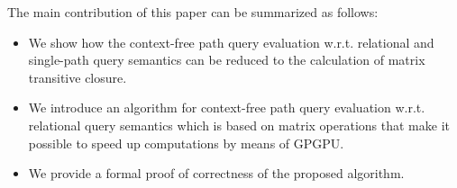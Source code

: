 The main contribution of this paper can be summarized as follows:
\begin{itemize}
	\item We show how the context-free path query evaluation w.r.t. relational and single-path query semantics can be reduced to the calculation of matrix transitive closure.
	\item We introduce an algorithm for context-free path query evaluation w.r.t. relational query semantics which is based on matrix operations that make it possible to speed up computations by means of GPGPU.
	\item We provide a formal proof of correctness of the proposed algorithm.
\end{itemize}
